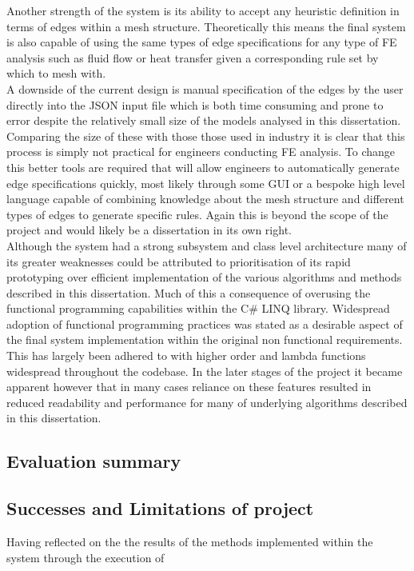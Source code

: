 \noindent
Another strength of the system is its ability to accept any heuristic definition in terms of edges within a mesh structure. Theoretically this means the final system is also capable of using the same types of edge specifications for any type of FE analysis such as fluid flow or heat transfer given a corresponding rule set by which to mesh with. \\


\noindent
A downside of the current design is manual specification of the edges by the user directly into the JSON input file which is both time consuming and prone to error despite the relatively small size of the models analysed in this dissertation. Comparing the size of these with those those used in industry it is clear that this process is simply not practical for engineers conducting FE analysis. To change this better tools are required that will allow engineers to automatically generate edge specifications quickly, most likely through some GUI or a bespoke high level language capable of combining knowledge about the mesh structure and different types of edges to generate specific rules. Again this is beyond the scope of the project and would likely be a dissertation in its own right. \\


\noindent
Although the system had a strong subsystem and class level architecture many of its greater weaknesses could be attributed to prioritisation of its rapid prototyping over efficient implementation of the various algorithms and methods described in this dissertation. Much of this a consequence of overusing the functional programming capabilities within the C\# LINQ library. Widespread adoption of functional programming practices was stated as a desirable aspect of the final system implementation within the original non functional requirements. This has largely been adhered to with  higher order and lambda functions widespread throughout the codebase. In the later stages of the project it became apparent however that in many cases reliance on these features resulted in reduced readability and performance for many of underlying algorithms described in this dissertation. \\




\subsection{Evaluation summary}



\subsection{Successes and Limitations of project}
Having reflected on the the results of the methods implemented within the system through the execution of
